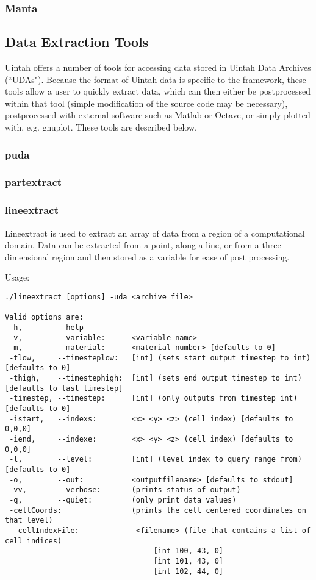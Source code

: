 \subsubsection{Manta}

\subsection{Data Extraction Tools}

Uintah offers a number of tools for accessing data stored in Uintah Data
Archives (``UDAs").  Because the format of Uintah data is specific to the 
framework, these tools allow a user to quickly extract data, which can then
either be postprocessed within that tool (simple modification of the source
code may be necessary), postprocessed with external software such as
Matlab or Octave, or simply plotted with, e.g. gnuplot.  These tools
are described below.

\subsubsection{puda}

\subsubsection{partextract}

\subsubsection{lineextract}

Lineextract is used to extract an array of data from a region of a computational domain. Data can be extracted from a point, along a line, or from a three dimensional region and then stored as a variable for ease of post processing. 

Usage: \begin{Verbatim}[fontsize=\footnotesize]
./lineextract [options] -uda <archive file>

Valid options are:
 -h,        --help
 -v,        --variable:      <variable name>
 -m,        --material:      <material number> [defaults to 0]
 -tlow,     --timesteplow:   [int] (sets start output timestep to int) [defaults to 0]
 -thigh,    --timestephigh:  [int] (sets end output timestep to int) [defaults to last timestep]
 -timestep, --timestep:      [int] (only outputs from timestep int) [defaults to 0]
 -istart,   --indexs:        <x> <y> <z> (cell index) [defaults to 0,0,0]
 -iend,     --indexe:        <x> <y> <z> (cell index) [defaults to 0,0,0]
 -l,        --level:         [int] (level index to query range from) [defaults to 0]
 -o,        --out:           <outputfilename> [defaults to stdout]
 -vv,       --verbose:       (prints status of output)
 -q,        --quiet:         (only print data values)
 -cellCoords:                (prints the cell centered coordinates on that level)
 --cellIndexFile:             <filename> (file that contains a list of cell indices)
                                  [int 100, 43, 0]
                                  [int 101, 43, 0]
                                  [int 102, 44, 0] 
\end{Verbatim}

